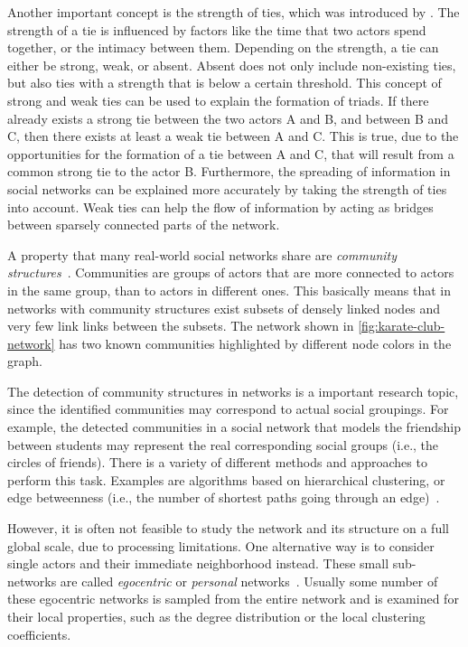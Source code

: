 Another important concept is the strength of ties, which was introduced by \citet{Granovetter1973}.
The strength of a tie is influenced by factors like the time that two actors spend together, or the intimacy between them.
Depending on the strength, a tie can either be strong, weak, or absent.
Absent does not only include non-existing ties, but also ties with a strength that is below a certain threshold.
This concept of strong and weak ties can be used to explain the formation of triads.
If there already exists a strong tie between the two actors A and B, and between B and C, then there exists at least a weak tie between A and C.
This is true, due to the opportunities for the formation of a tie between A and C, that will result from a common strong tie to the actor B.
Furthermore, the spreading of information in social networks can be explained more accurately by taking the strength of ties into account.
Weak ties can help the flow of information by acting as bridges between sparsely connected parts of the network.

A property that many real-world social networks share are \emph{community structures}~\cite{Girvan2002}.
Communities are groups of actors that are more connected to actors in the same group, than to actors in different ones.
This basically means that in networks with community structures exist subsets of densely linked nodes and very few link links between the subsets.
The network shown in \cref{fig:karate-club-network} has two known communities highlighted by different node colors in the graph.

The detection of community structures in networks is a important research topic, since the identified communities may correspond to actual social groupings.
For example, the detected communities in a social network that models the friendship between students may represent the real corresponding social groups (i.e., the circles of friends).
There is a variety of different methods and approaches to perform this task.
Examples are algorithms based on hierarchical clustering, or edge betweenness (i.e., the number of shortest paths going through an edge)~\cite{Fortunato2010}.

However, it is often not feasible to study the network and its structure on a full global scale, due to processing limitations.
One alternative way is to consider single actors and their immediate neighborhood instead.
These small sub-networks are called \emph{egocentric} or \emph{personal} networks~\cite{Newman2010}.
Usually some number of these egocentric networks is sampled from the entire network and is examined for their local properties, such as the degree distribution or the local clustering coefficients.

